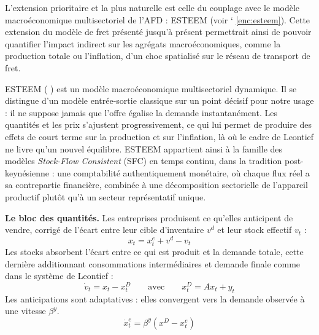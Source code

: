 \documentclass[12pt,a4paper,french]{report}
\newcounter{encadre}
\renewcommand{\theencadre}{\arabic{encadre}}
\newenvironment{encadre}[2]{%
	\refstepcounter{encadre}%
	\label{#1}%
	\begin{mdframed}[frametitle={Encadré \theencadre~: #2}]
}{%
	\end{mdframed}
}
\begin{document}
	L'extension prioritaire et la plus naturelle est celle du couplage avec le modèle macroéconomique multisectoriel de l'AFD : ESTEEM (voir {\catcode` \cref{enc:esteem}}). Cette extension du modèle de fret présenté jusqu'à présent permettrait ainsi de pouvoir quantifier l'impact indirect sur les agrégats macroéconomiques, comme la production totale ou l'inflation, d'un choc spatialisé sur le réseau de transport de fret.

	\begin{encadre}{enc:esteem}{Qu'est-ce que le modèle ESTEEM ?}
		ESTEEM ( \cite{ESTEEM}) est un modèle macroéconomique multisectoriel dynamique. Il se distingue d'un modèle entrée-sortie classique sur un point décisif pour notre usage : il ne suppose jamais que l'offre égalise la demande instantanément. Les quantités et les prix s'ajustent progressivement, ce qui lui permet de produire des effets de court terme sur la production et sur l'inflation, là où le cadre de Leontief ne livre qu'un nouvel équilibre. ESTEEM appartient ainsi à la famille des modèles \emph{Stock-Flow Consistent} (SFC) en temps continu, dans la tradition post-keynésienne : une comptabilité authentiquement monétaire, où chaque flux réel a sa contrepartie financière, combinée à une décomposition sectorielle de l'appareil productif plutôt qu'à un secteur représentatif unique. 
		
		\medskip
		\textbf{Le bloc des quantités.} Les entreprises produisent ce qu'elles anticipent de vendre, corrigé de l'écart entre leur cible d'inventaire $v^d$ et leur stock effectif $v_t$ :
		\begin{equation}
			x_t = x_t^e + v^d - v_t
			\label{eq:esteem_prod}
		\end{equation}
		Les stocks absorbent l'écart entre ce qui est produit et la demande totale, cette dernière additionnant consommations intermédiaires et demande finale comme dans le système de Leontief :
		\begin{equation}
			\dot{v}_t = x_t - x_t^D \qquad \text{avec} \qquad x_t^D = A x_t + y_t
			\label{eq:esteem_stocks}
		\end{equation}
		Les anticipations sont adaptatives : elles convergent vers la demande observée à une vitesse $\beta^y$.
		\begin{equation}
			\dot{x}_t^e = \beta^y \left(x^D - x_t^e\right)
			\label{eq:esteem_anticip}
		\end{equation}


\end{encadre}
\end{document}
